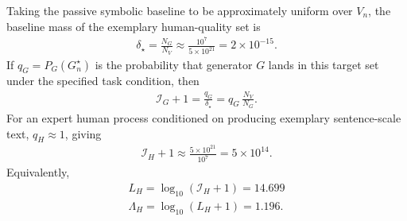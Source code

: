 \documentclass[
  aps,
  prresearch,
  reprint,
  amsmath,
  amssymb,
  superscriptaddress,
  nofootinbib,
  longbibliography
]{revtex4-2}
\def\EQSP{3pt}
\newcommand{\cgather}[2][\EQSP]{\begingroup\setlength\abovedisplayskip{#1}\setlength\belowdisplayskip{#1}\begin{gather} #2 \end{gather}\endgroup\noindent}
\newcommand{\calI}{\mathcal{I}}
\begin{document}
Taking the passive symbolic baseline to be approximately uniform over \(V_n\), the baseline mass of the exemplary human-quality set is
\cgather{
    \delta_\star
    =
    \frac{N_G}{N_V}
    \approx
    \frac{10^7}{5\times10^{21}}
    =
    2\times10^{-15}.
    \label{eq:human_delta_star}
}
If \(q_G=P_G(G_n^\star)\) is the probability that generator \(G\) lands in this target set under the specified task condition, then
\cgather{
    \calI_G+1
    =
    \frac{q_G}{\delta_\star}
    =
    q_G\,\frac{N_V}{N_G}.
    \label{eq:q_symbolic_lift}
}
For an expert human process conditioned on producing exemplary sentence-scale text, \(q_H\approx1\), giving
\cgather{
    \calI_H+1
    \approx
    \frac{5\times10^{21}}{10^7}
    =
    5\times10^{14}.
    \label{eq:human_symbolic_I}
}
Equivalently,
\cgather{
    L_H=\log_{10}(\calI_H+1)=14.699\\
    \Lambda_H
    =
    \log_{10}(L_H+1)
    =
    1.196.
    \label{eq:human_symbolic_lambda}
}
\end{document}
